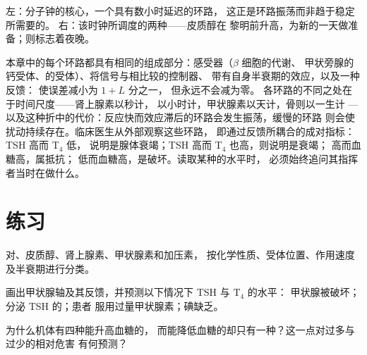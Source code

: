 \begin{omfigure}
{\small 左：分子钟的核心，一个具有数小时延迟的环路，
这正是环路振荡而非趋于稳定所需要的。
右：该时钟所调度的两种——皮质醇在
黎明前升高，为新的一天做准备；则标志着夜晚。}
\end{omfigure}

\begin{remark}[作为控制的稳态]\label{rem:b3:endocrinology:control}
本章中的每个环路都具有相同的组成部分：感受器（$\beta$ 细胞的代谢、
甲状旁腺的钙受体、的受体）、将信号与相比较的控制器、
带有自身半衰期的效应，以及一种反馈：
使误差减小为 $1 + L$ 分之一，
但永远不会减为零。
各环路的不同之处在于时间尺度——肾上腺素以秒计，
以小时计，甲状腺素以天计，骨则以一生计 ---
以及这种折中的代价：反应快而效应滞后的环路会发生振荡，缓慢的环路
则会使扰动持续存在。临床医生从外部观察这些环路，
即通过反馈所耦合的成对指标：TSH 高而 T$_{4}$ 低，
说明是腺体衰竭；TSH 高而 T$_{4}$ 也高，则说明是衰竭；
高而血糖高，属抵抗；
低而血糖高，是破坏。读取某种的水平时，
必须始终追问其指挥者当时在做什么。
\end{remark}

\section{练习}

\begin{exercise}[$\star$]\label{exo:b3:endocrinology:1}
对、皮质醇、肾上腺素、甲状腺素和加压素，
按化学性质、受体位置、作用速度及半衰期进行分类。
\end{exercise}

\begin{exercise}[$\star$]\label{exo:b3:endocrinology:2}
画出甲状腺轴及其反馈，并预测以下情况下 TSH 与 T$_{4}$ 的水平：
甲状腺被破坏；分泌 TSH 的；患者
服用过量甲状腺素；碘缺乏。
\end{exercise}

\begin{exercise}[$\star$]\label{exo:b3:endocrinology:3}
为什么机体有四种能升高血糖的，
而能降低血糖的却只有一种？这一点对过多与过少的相对危害
有何预测？
\end{exercise}

